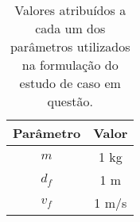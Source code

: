 \begin{table}[!htb]
	\centering
	\caption{Valores atribuídos a cada um dos parâmetros utilizados na formulação do estudo de caso em questão.}
	\label{tab:integrador:parametros}
	\begin{tabular}{|c|c|}
		\hline
		Parâmetro & Valor \\ \hline
		$m$       & 1 kg  \\ \hline
		$d_f$     & 1 m   \\ \hline
		$v_f$     & 1 m/s \\ \hline
	\end{tabular}
\end{table}